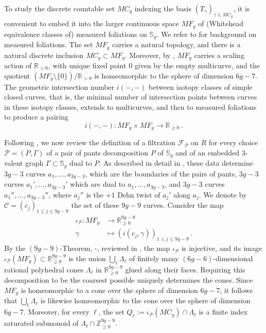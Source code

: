 \documentclass[12pt,letterpaper, reqno]{amsart}
\theoremstyle{defstyle} \newtheorem{definition}[theorem]{Definition}
\theoremstyle{remark}
\numberwithin{equation}{section}
\numberwithin{figure}{section}
\newcommand{\cF} {\mathcal{F}}
\newcommand{\cC} {\mathcal{C}}
\newcommand{\bS} {\mathbb{S}}
\newcommand{\RR} {\mathbb{R}}
\newcommand{\ZZ} {\mathbb{Z}}
\newcommand{\cP} {\mathcal{P}}
\begin{document}
To study the discrete countable set $MC_g$ indexing the basis $(T_\gamma)_{\gamma \in MC_g}$, it is convenient to embed it into the 
larger continuous space  $MF_g$ of (Whitehead equivalence classes of) measured foliations on $\bS_g$. We refer to \cite{thurston} for background on measured foliations. The set $MF_g$ carries a natural topology, and there is a natural discrete inclusion $MC_g \subset MF_g$. Moreover, by \cite[Theorem 6.15]{thurston}, $MF_g$ carries a scaling action of $\RR_{>0}$, with unique fixed point $0$ given by the empty multicurve, and the quotient $(MF_g  \setminus \{0\})/\RR_{>0}$ is homeomorphic to the sphere of dimension $6g-7$. 
 The geometric intersection number $i(-,-)$ between isotopy classes of simple closed curves, that is, the minimal number of intersection points between curves in these isotopy classes, extends to multicurves, and then to measured foliations to produce a pairing 
 \[ i(-,-): MF_g \times MF_g \longrightarrow \RR_{\geq 0}\,.\]

Following \cite{ayilliath2025geometric}, we now review the definition of a filtration $\cF_\cP$ on $R$ for every choice
$\cP=(P,\Gamma)$ of a pair of pants decomposition $P$ of $\bS_g$ and of an embedded 3-valent graph $\Gamma \subset \bS_g$ dual to $P$.
As described in detail in \cite[\S 3]{ayilliath2025geometric}, these data determine $3g-3$ curves $a_1, \dots, a_{3g-3}$, which are the 
boundaries of the pairs of pants, $3g-3$ curves $a_1', \dots, a_{3g-3}'$ which are dual to $a_1,\dots, a_{3g-3}$, and $3g-3$ curves $a_1'', \dots, a_{3g-3}''$, where $a_j''$ is the $+1$ Dehn twist of $a_j'$ along $a_j$. We denote by $\cC=(c_j)_{1 \leq j \leq 9g-9}$ the set of these $9g-9$ curves. Consider the map
\begin{align}\label{eq_iota_P}
\iota_\cP: MF_g &\longrightarrow \RR_{\geq 0}^{9g-9} 
\\  \nonumber
\gamma &\longmapsto (i(c_j,\gamma))_{1 \leq j \leq 9g-9} \,.
\end{align}
By the $(9g-9)$-Theorem, \cite[Theorem 4.10]{thurston}-\cite[p438]{farb_margalit}, reviewed in \cite[Theorem 1.4]{ayilliath2025geometric}, the map $\iota_\cP$ is injective, and 
its image $\iota_\cP(MF_g) \subset \RR_{\geq 0}^{9g-9}$ is the union $\bigcup_{\ell} \Lambda_\ell$ of finitely many $(6g-6)$-dimensional rational polyhedral cones $\Lambda_\ell$ in $\RR_{\geq 0}^{9g-9}$ glued along their faces. Requiring this decomposition to be the coarsest possible uniquely determines the cones. 
Since $MF_g$ is homeomorphic to a cone over the sphere of dimension $6g-7$, it follows that $\bigcup_\ell \Lambda_\ell$ is likewise homeomorphic to the cone over the sphere of dimension $6g-7$.
Moreover, for every $\ell$, the set
$Q_\ell := \iota_\cP(MC_g) \cap \Lambda_\ell$ is a finite index saturated submonoid of $\Lambda_\ell \cap \ZZ_{\geq 0}^{9g-9}$.
\end{document}
